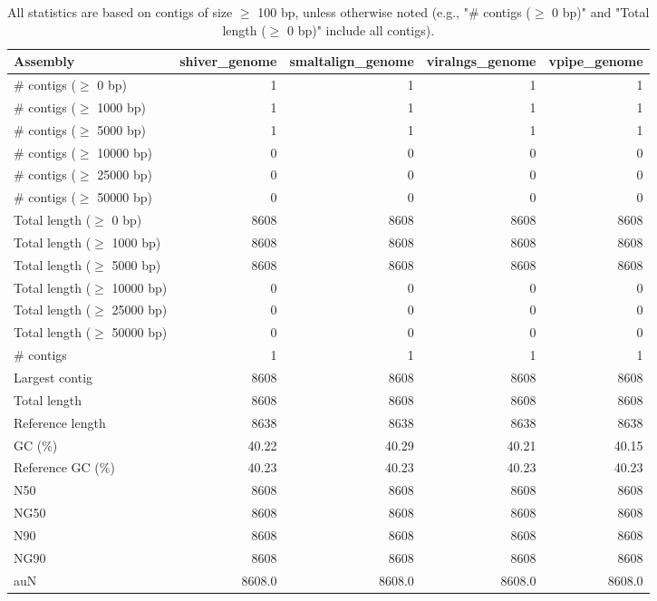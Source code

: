 \documentclass[12pt,a4paper]{article}
\begin{document}
\begin{table}[ht]
\begin{center}
\caption{All statistics are based on contigs of size $\geq$ 100 bp, unless otherwise noted (e.g., "\# contigs ($\geq$ 0 bp)" and "Total length ($\geq$ 0 bp)" include all contigs).}
\begin{tabular}{|l*{4}{|r}|}
\hline
Assembly & shiver\_genome & smaltalign\_genome & viralngs\_genome & vpipe\_genome \\ \hline
\# contigs ($\geq$ 0 bp) & 1 & 1 & 1 & 1 \\ \hline
\# contigs ($\geq$ 1000 bp) & 1 & 1 & 1 & 1 \\ \hline
\# contigs ($\geq$ 5000 bp) & 1 & 1 & 1 & 1 \\ \hline
\# contigs ($\geq$ 10000 bp) & 0 & 0 & 0 & 0 \\ \hline
\# contigs ($\geq$ 25000 bp) & 0 & 0 & 0 & 0 \\ \hline
\# contigs ($\geq$ 50000 bp) & 0 & 0 & 0 & 0 \\ \hline
Total length ($\geq$ 0 bp) & 8608 & 8608 & 8608 & 8608 \\ \hline
Total length ($\geq$ 1000 bp) & 8608 & 8608 & 8608 & 8608 \\ \hline
Total length ($\geq$ 5000 bp) & 8608 & 8608 & 8608 & 8608 \\ \hline
Total length ($\geq$ 10000 bp) & 0 & 0 & 0 & 0 \\ \hline
Total length ($\geq$ 25000 bp) & 0 & 0 & 0 & 0 \\ \hline
Total length ($\geq$ 50000 bp) & 0 & 0 & 0 & 0 \\ \hline
\# contigs & 1 & 1 & 1 & 1 \\ \hline
Largest contig & 8608 & 8608 & 8608 & 8608 \\ \hline
Total length & 8608 & 8608 & 8608 & 8608 \\ \hline
Reference length & 8638 & 8638 & 8638 & 8638 \\ \hline
GC (\%) & 40.22 & 40.29 & 40.21 & 40.15 \\ \hline
Reference GC (\%) & 40.23 & 40.23 & 40.23 & 40.23 \\ \hline
N50 & 8608 & 8608 & 8608 & 8608 \\ \hline
NG50 & 8608 & 8608 & 8608 & 8608 \\ \hline
N90 & 8608 & 8608 & 8608 & 8608 \\ \hline
NG90 & 8608 & 8608 & 8608 & 8608 \\ \hline
auN & 8608.0 & 8608.0 & 8608.0 & 8608.0 \\ \hline

\end{tabular}
\end{center}
\end{table}
\end{document}
